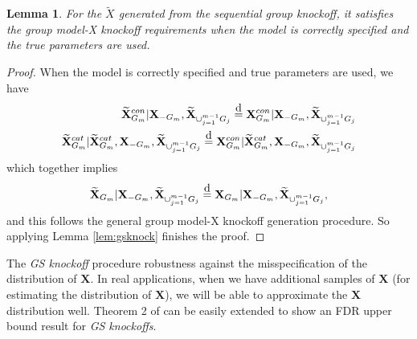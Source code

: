 \documentclass[11pt]{article}
\theoremstyle{plain}
\newtheorem{lemma}[theorem]{Lemma}
\theoremstyle{definition}
\theoremstyle{remark}
\newcommand\eqd{\stackrel{\mathclap{\normalfont\mbox{d}}}{=}}
\newcommand{\X}{\mathbf{X}}
\newcommand{\0}{\mathbf{0}}
\begin{document}
\begin{lemma}\label{lem:gseqknock}
For the $\widetilde{X}$ generated from the sequential group knockoff, it satisfies the group model-X knockoff requirements when the model is correctly specified and the true parameters are used.
\end{lemma}
\begin{proof}
When the model is correctly specified and true parameters are used, we have
\begin{eqnarray*}
\widetilde{\X}_{G_m}^{con}|\X_{-G_m}, \widetilde{\X}_{\cup_{j=1}^{m-1}G_j}\eqd \X_{G_m}^{con}|\X_{-G_m}, \widetilde{\X}_{\cup_{j=1}^{m-1}G_j}\\
\widetilde{\X}_{G_m}^{cat}|\widetilde{\X}_{G_m}^{cat},\X_{-G_m}, \widetilde{\X}_{\cup_{j=1}^{m-1}G_j}\eqd \X_{G_m}^{con}|\widetilde{\X}_{G_m}^{cat},\X_{-G_m}, \widetilde{\X}_{\cup_{j=1}^{m-1}G_j}
\end{eqnarray*}
which together implies
\begin{eqnarray*}
\widetilde{\X}_{G_m}|\X_{-G_m}, \widetilde{\X}_{\cup_{j=1}^{m-1}G_j}\eqd \X_{G_m}|\X_{-G_m}, \widetilde{\X}_{\cup_{j=1}^{m-1}G_j},
\end{eqnarray*}
and this follows the general group model-X knockoff generation procedure. So applying Lemma \ref{lem:gsknock} finishes the proof.
\end{proof}

The \textit{GS knockoff} procedure robustness against the misspecification of the distribution of $\X$. In real applications, when we have additional samples of $\X$ (for estimating the distribution of $\X$), we will be able to approximate the $\X$ distribution well. Theorem 2 of \cite{dai2021multiple} can be easily extended to show an FDR upper bound result for \textit{GS knockoffs}. 


\end{document}
